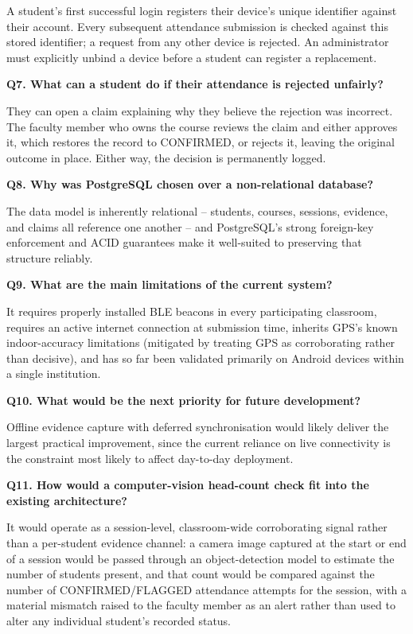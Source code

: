 \documentclass[12pt, a4paper, oneside]{report}
\begin{document}
A student's first successful login registers their device's unique identifier against their account. Every subsequent attendance submission is checked against this stored identifier; a request from any other device is rejected. An administrator must explicitly unbind a device before a student can register a replacement.

\noindent\textbf{Q7. What can a student do if their attendance is rejected unfairly?}

They can open a claim explaining why they believe the rejection was incorrect. The faculty member who owns the course reviews the claim and either approves it, which restores the record to CONFIRMED, or rejects it, leaving the original outcome in place. Either way, the decision is permanently logged.

\noindent\textbf{Q8. Why was PostgreSQL chosen over a non-relational database?}

The data model is inherently relational -- students, courses, sessions, evidence, and claims all reference one another -- and PostgreSQL's strong foreign-key enforcement and ACID guarantees make it well-suited to preserving that structure reliably.

\noindent\textbf{Q9. What are the main limitations of the current system?}

It requires properly installed BLE beacons in every participating classroom, requires an active internet connection at submission time, inherits GPS's known indoor-accuracy limitations (mitigated by treating GPS as corroborating rather than decisive), and has so far been validated primarily on Android devices within a single institution.

\noindent\textbf{Q10. What would be the next priority for future development?}

Offline evidence capture with deferred synchronisation would likely deliver the largest practical improvement, since the current reliance on live connectivity is the constraint most likely to affect day-to-day deployment.

\noindent\textbf{Q11. How would a computer-vision head-count check fit into the existing architecture?}

It would operate as a session-level, classroom-wide corroborating signal rather than a per-student evidence channel: a camera image captured at the start or end of a session would be passed through an object-detection model to estimate the number of students present, and that count would be compared against the number of CONFIRMED/FLAGGED attendance attempts for the session, with a material mismatch raised to the faculty member as an alert rather than used to alter any individual student's recorded status.
\end{document}
